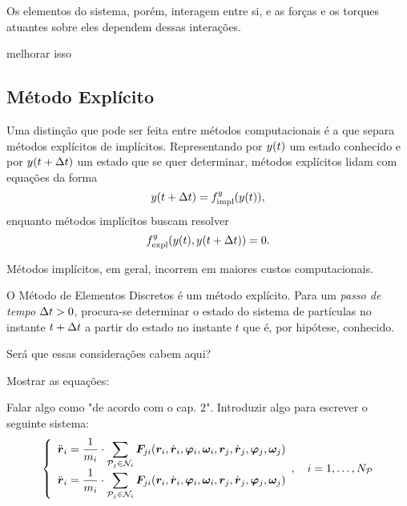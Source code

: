 Os elementos do sistema, porém, interagem entre si, e as forças e os torques atuantes sobre eles dependem dessas interações.

\alert{melhorar isso}

\subsection{Método Explícito}

Uma distinção que pode ser feita entre métodos computacionais é a que separa métodos explícitos de implícitos. Representando por \(y\pqty{t}\) um estado conhecido e por \(y\pqty{t+\Dt}\) um estado que se quer determinar, métodos explícitos lidam com equações da forma
\begin{equation*}
	y\pqty{t+\Dt} = \eqForExplicit{y}\pqty{y\pqty{t}},
\end{equation*}
enquanto métodos implícitos buscam resolver
\begin{equation*}
	\eqForImplicit{y}\pqty{y\pqty{t}, y\pqty{t+\Dt}} = 0.
\end{equation*}

Métodos implícitos, em geral, incorrem em maiores custos computacionais. 

O Método de Elementos Discretos é um método explícito. Para um \textit{passo de tempo} \(\Delta t>0\), procura-se determinar o estado do sistema de partículas no instante \(t+\Delta t\) a partir do estado no instante \(t\) que é, por hipótese, conhecido.

\alert{Será que essas considerações cabem aqui?}

\alert{Mostrar as equações:}

\alert{Falar algo como "de acordo com o cap. 2".}
\alert{Introduzir algo para escrever o seguinte sistema:}
\begin{equation*}
	\left\lbrace
		\begin{array}{l}
			\accelerationi = \inverted{\massi}\cdot\dsum_{\particlej\in\neighborhoodi} \forceji\pqty{\positioni, \velocityi, \orientationi, \angularVelocityi, \positionj, \velocityj, \orientationj, \angularVelocityj}
			\\
			\accelerationi = \inverted{\massi}\cdot\dsum_{\particlej\in\neighborhoodi} \forceji\pqty{\positioni, \velocityi, \orientationi, \angularVelocityi, \positionj, \velocityj, \orientationj, \angularVelocityj}
		\end{array},\quad i = 1, \dots, \numberOfParticles
	\right.
\end{equation*}

